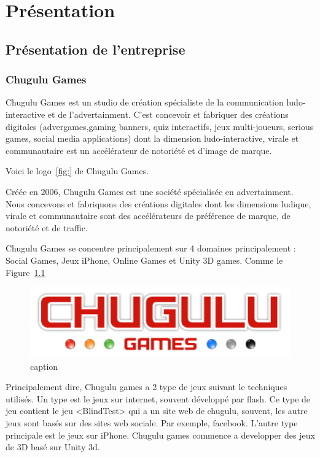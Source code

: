 \chapter{Présentation} %

\section{Présentation de l'entreprise} %

\subsection{Chugulu Games} %

Chugulu Games est un studio de création spécialiste de la communication ludo-interactive et de l'advertainment. C'est concevoir et fabriquer des créations digitales (advergames,gaming banners, quiz interactifs, jeux multi-joueurs, serious games, social media applications) dont la dimension ludo-interactive, virale et communautaire est un accélérateur de notoriété et d'image de marque.

Voici le logo~\ref{fig:} de Chugulu Games.

Créée en 2006, Chugulu Games est une société spécialisée en advertainment. Nous concevons et fabriquons des créations digitales dont les dimensions ludique, virale et communautaire sont des accélérateurs de préférence de marque, de notoriété et de traffic.

Chugulu Games se concentre principalement sur 4 domaines principalement : Social Games, Jeux iPhone, Online Games et Unity 3D games. Comme le Figure~\ref{fig:Image_Chugulu_Games1} 


\begin{figure}[htbp]
	\centering
		\includegraphics[width=6in]{Image/Chugulu-Games1.jpg}
	\caption{caption}
	\label{fig:Image_Chugulu_Games1}
\end{figure}

Principalement dire, Chugulu games a 2 type de jeux suivant le techniques utilisés. Un type est le jeux sur internet, souvent développé par flash. Ce type de jeu contient le jeu <BlindTest> qui a un site web de chugulu, souvent, les autre jeux sont basés sur des sites web sociale. Par exemple, facebook. L'autre type principale est le jeux sur iPhone. Chugulu games commence a developper des jeux de 3D basé sur Unity 3d. 

